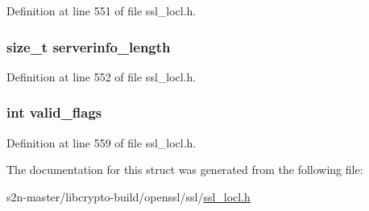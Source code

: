 Definition at line 551 of file ssl\+\_\+locl.\+h.

\subsubsection[{\texorpdfstring{serverinfo\+\_\+length}{serverinfo_length}}]{\setlength{\rightskip}{0pt plus 5cm}size\+\_\+t serverinfo\+\_\+length}\hypertarget{structcert__pkey__st_a3ad0e8d87bf43bae4b28aee89009c827}{}\label{structcert__pkey__st_a3ad0e8d87bf43bae4b28aee89009c827}


Definition at line 552 of file ssl\+\_\+locl.\+h.

\subsubsection[{\texorpdfstring{valid\+\_\+flags}{valid_flags}}]{\setlength{\rightskip}{0pt plus 5cm}int valid\+\_\+flags}\hypertarget{structcert__pkey__st_afcde860a0b9f2ec532241930180a1582}{}\label{structcert__pkey__st_afcde860a0b9f2ec532241930180a1582}


Definition at line 559 of file ssl\+\_\+locl.\+h.



The documentation for this struct was generated from the following file\+:\begin{DoxyCompactItemize}
\item 
s2n-\/master/libcrypto-\/build/openssl/ssl/\hyperlink{ssl__locl_8h}{ssl\+\_\+locl.\+h}\end{DoxyCompactItemize}
